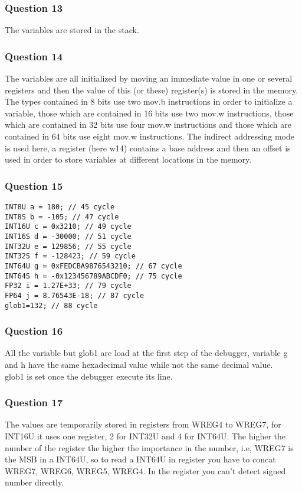 \documentclass[a4paper,10pt]{article}
\begin{document}
\subsubsection*{Question 13}
The variables are stored in the stack.

\subsubsection*{Question 14}
The variables are all initialized by moving an immediate value in one or several registers and then the value of  this (or these) register(s) is stored in the memory. The types contained in 8 bits use two mov.b instructions in order to initialize a variable, those which are contained in 16 bits use two mov.w instructions, those which are contained in 32 bits use four mov.w instructions and those which are contained in 64 bits use eight mov.w instructions. The indirect addressing mode is used here, a register (here w14) contains a base address and then an offset is used in order to store variables at different locations in the memory.

\subsubsection*{Question 15}
\begin{verbatim}
INT8U a = 180; // 45 cycle
INT8S b = -105; // 47 cycle
INT16U c = 0x3210; // 49 cycle
INT16S d = -30000; // 51 cycle
INT32U e = 129856; // 55 cycle
INT32S f = -128423; // 59 cycle
INT64U g = 0xFEDCBA9876543210; // 67 cycle
INT64S h = -0x123456789ABCDF0; // 75 cycle
FP32 i = 1.27E+33; // 79 cycle
FP64 j = 8.76543E-18; // 87 cycle
glob1=132; // 88 cycle
\end{verbatim}

\subsubsection*{Question 16}
All the variable but glob1 are load at the first step of the debugger, variable g and h have the same hexadecimal value while not the same decimal value.\\
glob1 is set once the debugger execute its line.

\subsubsection*{Question 17}
The values are temporarily stored in registers from WREG4 to WREG7, for INT16U it uses one register, 2 for INT32U and 4 for INT64U. The higher the number of the register the higher the importance in the number, i.e, WREG7 is the MSB in a INT64U, so to read a INT64U in register you have to concat WREG7, WREG6, WREG5, WREG4.
In the register you can't detect signed number directly.
\end{document}

